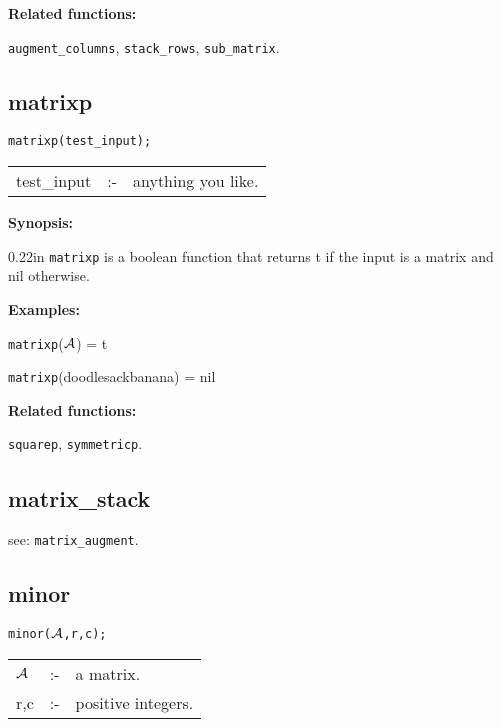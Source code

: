 {\bf Related functions:}

\hspace*{0.175in} {\tt augment\_columns}, {\tt stack\_rows},
{\tt sub\_matrix}.


\subsection{matrixp}


\hspace*{0.175in} {\tt matrixp(test\_input);}

\hspace*{0.1in}
\begin{tabular}{l l l}
test\_input &:-& anything you like.
\end{tabular}

{\bf Synopsis:} %

\begin{addtolength}{\leftskip}{0.22in}
{\tt matrixp} is a boolean function that returns t if
                the input is a matrix and nil otherwise.

\end{addtolength}

{\bf Examples:}

\hspace*{0.175in} {\tt matrixp}(${\cal A}$) = t

\hspace*{0.175in} {\tt matrixp}(doodlesackbanana) = nil

{\bf Related functions:}

\hspace*{0.175in} {\tt squarep}, {\tt symmetricp}.


\subsection{matrix\_stack}

\hspace*{0.175in} see: {\tt matrix\_augment}.


\subsection{minor}


\hspace*{0.175in} {\tt minor(${\cal A}$,r,c);}

\hspace*{0.1in}
\begin{tabular}{l l l}
${\cal A}$ &:-& a matrix. \\
r,c        &:-& positive integers.
\end{tabular}

